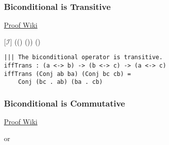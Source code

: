 \documentclass{acm_proc_article-sp}
\begin{document}
\subsubsection{Biconditional is
Transitive}\label{biconditional-is-transitive}

\href{https://proofwiki.org/wiki/Biconditional_is_Transitive}{Proof
Wiki}

\begin{prooftree*}
  \Hypo{ (\varphi \iff \psi) \land (\psi \iff \chi) }
  [$\mathcal I$]{ ((\varphi \iff \psi) \land (\psi \iff \chi)) \implies (\varphi \iff \chi) }
\end{prooftree*}

\begin{verbatim}
||| The biconditional operator is transitive.
iffTrans : (a <-> b) -> (b <-> c) -> (a <-> c)
iffTrans (Conj ab ba) (Conj bc cb) =
    Conj (bc . ab) (ba . cb)
\end{verbatim}

\subsubsection{Biconditional is
Commutative}\label{biconditional-is-commutative}

\href{https://proofwiki.org/wiki/Biconditional_is_Commutative}{Proof
Wiki}


\begin{center}or\end{center}

\end{document}
